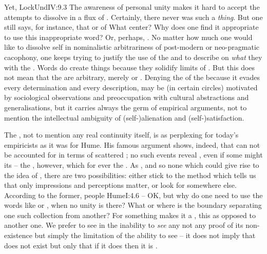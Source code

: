 Yet, \citet{we perceive it so plainly and so certainly, that it neither needs
  nor is capable of any proof.}{LockUnd}{IV:9.3} The awareness of personal unity
makes it hard to accept the attempts to dissolve  in a flux of
.  Certainly, there never was such a {\em
  thing}.  But one still says, for instance, that  or of 
What center? Why does one find it appropriate to use this inappropriate word?
Or, perhaps, . No matter how
much one would like to dissolve self in nominalistic arbitrariness of
post-modern or neo-pragmatic cacophony, one keeps trying to justify the use of
the  and to describe on {\em what} they  with the
. Words do create things because they solidify limits of
. But this does not mean that the  are
arbitrary, merely  or .  Denying the 
of the  because it evades every determination and every 
description, may be (in certain circles) motivated by sociological observations
and preoccupation with cultural abstractions and generalisations, but it carries
always the germ of empirical arguments, not to mention the intellectual
ambiguity of (self-)alienation and (self-)satisfaction.

\pa The , not to mention any real continuity itself, is
as perplexing for today's empiricists as it was for Hume. His famous argument
shows, indeed, that  can not be accounted for in terms of scattered
 ; no such events reveal , even
if some might  its  -- the , however,
which for ever  the \hoa.  As , and so none which could give rise to the idea of ,
there are two possibilities: either stick to the method which tells us that only
impressions and perceptions matter, or look for  somewhere else.
According to the former, people \citet{are nothing but a bundle or collection of
  different perceptions}{Hume}{I:4.6} -- OK, but why do one need to use the
words like  or , when no unity is there? What or where
is the boundary separating one such collection from another? For something makes
it a , this  as opposed to another one. We
prefer to see in the inability to {\em see} any  not any proof of its
non-existence but simply the limitation of the  ability to see -- it
does not imply that  does not exist but only that if it does then it is
.

